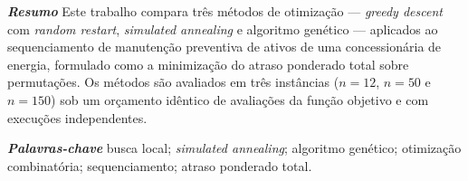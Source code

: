 \noindent\textbf{\textit{Resumo}}\; Este trabalho compara três métodos de otimização --- \textit{greedy descent} com \textit{random restart}, \textit{simulated annealing} e algoritmo genético --- aplicados ao sequenciamento de manutenção preventiva de ativos de uma concessionária de energia, formulado como a minimização do atraso ponderado total sobre permutações. Os métodos são avaliados em três instâncias ($n=12$, $n=50$ e $n=150$) sob um orçamento idêntico de avaliações da função objetivo e com execuções independentes.

\vspace{0.3cm}
\noindent\textbf{\textit{Palavras-chave}}\; busca local; \textit{simulated annealing}; algoritmo genético; otimização combinatória; sequenciamento; atraso ponderado total.

\vspace{0.5cm}